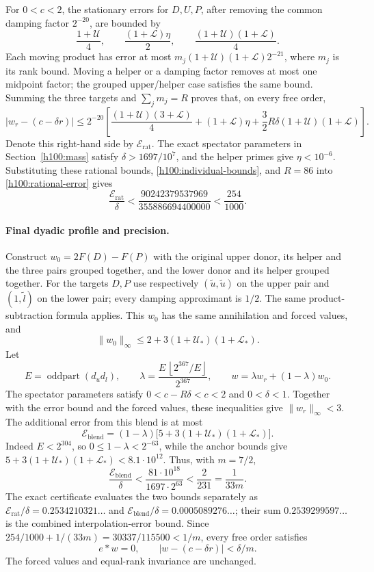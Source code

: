 For $0<c<2$, the stationary errors for $D,U,P$, after removing the
common damping factor $2^{-20}$, are bounded by
\[
 \frac{1+\mathcal U}{4},\qquad
 \frac{(1+\mathcal L)\eta}{2},\qquad
 \frac{(1+\mathcal U)(1+\mathcal L)}4.
\]
Each moving product has error at most
$m_j(1+\mathcal U)(1+\mathcal L)2^{-21}$, where $m_j$ is its rank
bound.  Moving a helper or a damping factor removes at most one
midpoint factor; the grouped upper/helper case satisfies the same
bound.  Summing the three targets and $\sum_jm_j=R$ proves that, on
every free order,
\begin{equation}\label{h100:rational-error}
 |w_r-(c-\delta r)|\le2^{-20}
 \left[\frac{(1+\mathcal U)(3+\mathcal L)}4
       +(1+\mathcal L)\eta
       +\frac32R\delta(1+\mathcal U)(1+\mathcal L)\right].
\end{equation}
Denote this right-hand side by $\mathcal E_{\mathrm{rat}}$.  The exact
spectator parameters in Section~\ref{h100:mass} satisfy
$\delta>1697/10^7$, and the helper primes give $\eta<10^{-6}$.
Substituting these rational bounds, \eqref{h100:individual-bounds}, and
$R=86$ into \eqref{h100:rational-error} gives
\[
 \frac{\mathcal E_{\mathrm{rat}}}{\delta}
 <\frac{90242379537969}{355886694400000}
 <\frac{254}{1000}.
\]

\paragraph{Final dyadic profile and precision.}
Construct $w_0=2F(D)-F(P)$ with the original upper donor, its helper
and the three pairs grouped together, and the lower donor and its helper
grouped together.  For the targets $D,P$ use respectively
$(\widetilde u,\widetilde u)$ on the upper pair and
$(1,\widetilde l)$ on the lower pair; every damping approximant is
$1/2$.  The same product-subtraction formula applies.  This $w_0$ has
the same annihilation and forced values, and
\[
 \|w_0\|_\infty\le2+3(1+\mathcal U_*)(1+\mathcal L_*).
\]
Let
\[
 E=\operatorname{oddpart}(d_ud_l),\qquad
 \lambda=\frac{E\,\left\lfloor2^{367}/E\right\rfloor}{2^{367}},\qquad
 w=\lambda w_r+(1-\lambda)w_0.
\]
The spectator parameters satisfy $0<c-R\delta<c<2$ and $0<\delta<1$. Together with the error bound and the forced values, these inequalities give $\|w_r\|_\infty<3$.
The additional error from this blend is at most
\[
 \mathcal E_{\mathrm{blend}}=
 (1-\lambda)\bigl[5+3(1+\mathcal U_*)(1+\mathcal L_*)\bigr].
\]
Indeed $E<2^{304}$, so $0\le1-\lambda<2^{-63}$, while the anchor
bounds give $5+3(1+\mathcal U_*)(1+\mathcal L_*)<8.1\cdot10^{12}$.
Thus, with $m=7/2$,
\[
 \frac{\mathcal E_{\mathrm{blend}}}{\delta}
 <\frac{81\cdot10^{18}}{1697\cdot2^{63}}
 <\frac{2}{231}=\frac1{33m}.
\]
The exact certificate evaluates the two bounds separately as
$\mathcal E_{\mathrm{rat}}/\delta=0.2534210321\ldots$ and
$\mathcal E_{\mathrm{blend}}/\delta=0.0005089276\ldots$; their sum
$0.2539299597\ldots$ is the combined interpolation-error bound.
Since $254/1000+1/(33m)=30337/115500<1/m$, every free order satisfies
\begin{equation}\label{h100:final-profile}
 e*w=0,\qquad |w-(c-\delta r)|<\delta/m.
\end{equation}
The forced values and equal-rank invariance are unchanged.

